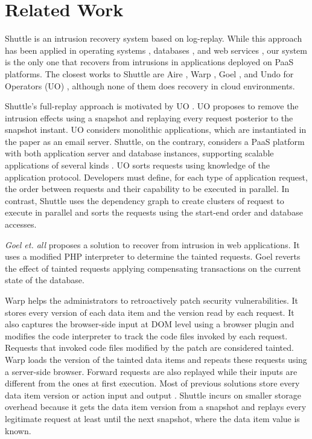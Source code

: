 
\section{Related Work}
\label{sec:related_work}

Shuttle is an intrusion recovery system based on log-replay. While this approach has been applied in operating systems \cite{taser,retro,dare}, databases \cite{itdb,phoenix}, and web services \cite{warp,goel,aire}, our system is the only one that recovers from intrusions in applications deployed on \ac{PaaS} platforms. The closest works to Shuttle are Aire \cite{aire}, Warp \cite{warp}, Goel \cite{goel}, and Undo for Operators (UO) \cite{undoForOperators}, although none of them does recovery in cloud environments.

Shuttle's full-replay approach is motivated by UO \cite{undoForOperators}. UO proposes to remove the intrusion effects using a snapshot and replaying every request posterior to the snapshot instant.  UO considers monolithic applications, which are instantiated in the paper as an email server. Shuttle, on the contrary, considers a \ac{PaaS} platform with both application server and database instances, supporting scalable applications of several kinds . UO sorts requests using knowledge of the application protocol. Developers must define, for each type of application request, the order between requests and their capability to be executed in parallel. In contrast, Shuttle uses the dependency graph to create clusters of request to execute in parallel and sorts the requests using the start-end order and database accesses.


\emph{Goel et. all} \cite{goel} proposes a solution to recover from intrusion in web applications. It uses a modified PHP interpreter to determine the tainted requests. Goel reverts the effect of tainted requests applying compensating transactions on the current state of the database. %

Warp \cite{warp} helps the administrators to retroactively patch security vulnerabilities. It stores every version of each data item and the version read by each request. It also captures the browser-side input at DOM level using a browser plugin and modifies the code interpreter to track the code files invoked by each request. Requests that invoked code files modified by the patch are considered tainted. Warp loads the version of the tainted data items and repeats these requests using a server-side browser. Forward requests are also replayed while their inputs are different from the ones at first execution. Most of previous solutions store every data item version or action input and output \cite{warp,aire}. Shuttle incurs on smaller storage overhead because it gets the data item version from a snapshot and replays every legitimate request at least until the next snapshot, where the data item value is known.

